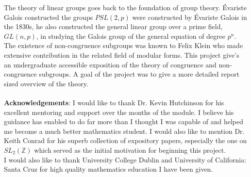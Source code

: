 


\begin{abstracts}        %

The theory of linear groups goes back to the foundation of group theory. Évariste Galois constructed the groups $PSL(2,p)$ were constructed by Évariste Galois in the 1830s, he also constructed the general linear group over a prime field, $GL(n, p)$, in studying the Galois group of the general equation of degree $p^n$. The existence of non-congruence subgroups was known to Felix Klein who made extensive contribution in the related field of modular forms. This project give's an undergraduate accessible exposition of the theory of congruence and non-congruence subgroups. A goal of the project was to give a more detailed report sized overview of the theory. \\
\\

\textbf{Acknowledgements}: I would like to thank Dr. Kevin Hutchinson for his excellent mentoring and support over the months of the module. I believe his guidance has enabled to do far more than I thought I was capable of and helped me become a much better mathematics student. I would also like to mention Dr. Keith Conrad for his superb collection of expository papers, especially the one on $SL_2(\mathbb{Z})$ \citep{conrad} which served as the initial motivation for beginning this project. \\
I would also like to thank University College Dublin and University of California: Santa Cruz for high quality mathematics education I have been given.
 

\end{abstracts}




